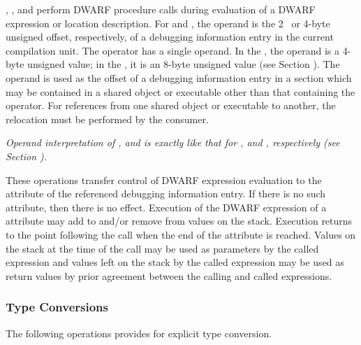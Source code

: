 \begin{enumerate}[1. ]
\itembfnl{\DWOPcalltwoTARG, \DWOPcallfourTARG, \DWOPcallrefTARG}
\DWOPcalltwoNAME, 
\DWOPcallfourNAME, 
and \DWOPcallrefNAME{} perform
DWARF procedure calls during evaluation of a DWARF expression or
location description. 
For \DWOPcalltwoNAME{} and \DWOPcallfourNAME{}, 
the operand is the 2\dash~ or 4-byte unsigned offset, respectively,
of a debugging information entry in the current compilation
unit. The \DWOPcallrefNAME{} operator has a single operand. In the
\thirtytwobitdwarfformat,
the operand is a 4-byte unsigned value;
in the \sixtyfourbitdwarfformat, it is an 8-byte unsigned value
(see Section ). 
The operand is used as the offset of a
debugging information entry in a 
\dotdebuginfo{}
section which may be contained in a shared object or executable
other than that containing the operator. For references from
one shared object or executable to another, the relocation
must be performed by the consumer.  

\textit{Operand interpretation of
\DWOPcalltwo, \DWOPcallfour{} and \DWOPcallref{} is exactly like
that for \DWFORMreftwo, \DWFORMreffour{} and \DWFORMrefaddr,
respectively  
(see Section  ).  
}

These operations transfer
control of DWARF expression evaluation to 
the 
\DWATlocation{}
attribute of the referenced debugging information entry. If
there is no such attribute, then there is no effect. Execution
of the DWARF expression of 
a 
\DWATlocation{} attribute may add
to and/or remove from values on the stack. Execution returns
to the point following the call when the end of the attribute
is reached. Values on the stack at the time of the call may be
used as parameters by the called expression and values left on
the stack by the called expression may be used as return values
by prior agreement between the calling and called expressions.
\end{enumerate}

\subsubsection{Type Conversions}
\label{chap:typeconversions}
The following operations provides for explicit type conversion.

